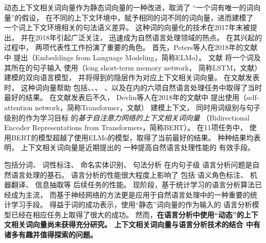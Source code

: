 动态上下文相关词向量\cite{NIPS2017_7209,peters-EtAl:2018:N18-1,P18-1031,gpt1,DBLP:journals/corr/abs-1810-04805}作为静态词向量的一种改进，取消了
``一个词有唯一的词向量''的假设，
在不同的上下文环境中，赋予相同的词不同的词向量，进而建模了
一个词上下文环境相关的句法语义差异。
这种词的向量化的技术在2017年末被提出，
并在2018年引起广泛关注，
迅速成为自然语言处理领域的热点。
在其兴起的过程中，
两项代表性工作扮演了重要的角色。
首先，Peters等人在2018年的文献中
提出\textit{\elmochinesetranslation}（Embeddings from Language Modeling，简称ELMo）。
文献
将一个词及其所在的句子输入
使用（long short-term memory network，
简称LSTM，文献）
建模的双向语言模型，
并将得到的隐层作为对应上下文相关词向量。
在文献发表时，
这种词向量帮助
包括、、、
、以及在内的六项自然语言处理任务中取得了当时最好的结果。
在文献发表后不久，
Devlin等人在2018年的文献中
提出使用（self-attention network，简称Transformer，文献）
建模上下文，
同时用词级别与句子级别的作为学习目标
的\textit{基于自注意力网络的上下文相关词向量}
（Bidirectional Encoder Representations from Transformers，简称BERT）。
在11项任务中，
使用BERT的模型超越了使用ELMo的模型，取得了当前最好的结果。
种种结果均表明，
上下文相关词向量是近期提出的
一种提高自然语言处理性能的
有效手段。

包括分词\cite{Xue:2003:CWS:1119250.1119278,zhang-clark:2007:ACLMain,zheng-chen-xu:2013:EMNLP}、
词性标注\cite{Toutanova:2003:FPT:1073445.1073478,DBLP:journals/corr/HuangXY15,ma-hovy:2016:P16-1}、
命名实体识别\cite{Ando:2005:FLP:1046920.1194905,lample-EtAl:2016:N16-1}、
句法分析\cite{mcdonald2006online,nivre2008algorithms,zhang-clark:2008:ACLMain,chen-manning:2014:EMNLP2014,DBLP:journals/corr/DozatM16}
在内句子级
语言分析问题是自然语言处理的基石。
语言分析的性能很大程度上影响了
包括
语义角色标注\cite{W04-3212,li-etal-2010-joint}、
机器翻译\cite{dyer-2009-using,aharoni-goldberg-2017-towards}、
信息抽取等
后续任务的性能。
现阶段，基于统计学习的语言分析算法已经成为主流，
而基于神经网络的方法更是应用于自然语言处理中的一种重要的统计学习手段。
得益于词的成功表示，使用``静态''词向量的作为输入的
语言分析模型已经在相应任务上取得了很大的成功。\cite{zheng-chen-xu:2013:EMNLP,chen-manning:2014:EMNLP2014,DBLP:journals/corr/HuangXY15,ma-hovy:2016:P16-1,DBLP:journals/corr/DozatM16}
然而，\textbf{在语言分析中使用``动态''的上下文相关词向量尚未获得充分研究。
上下文相关词向量与语言分析技术的结合
中有诸多有趣并值得探索的问题。}

